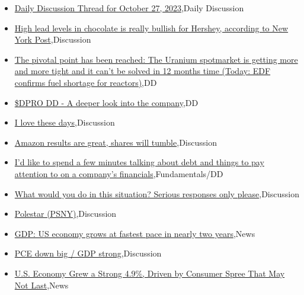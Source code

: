 \documentclass{article}%
\begin{document}
%
\begin{itemize}%
\item%
\href{https://reddit.com/r/wallstreetbets/comments/17hk3jn/daily\_discussion\_thread\_for\_october\_27\_2023/}{Daily Discussion Thread for October 27, 2023},Daily Discussion%
\item%
\href{https://reddit.com/r/wallstreetbets/comments/17hgve8/high\_lead\_levels\_in\_chocolate\_is\_really\_bullish/}{High lead levels in chocolate is really bullish for Hershey, according to New York Post},Discussion%
\item%
\href{https://reddit.com/r/Baystreetbets/comments/17hl3ly/the\_pivotal\_point\_has\_been\_reached\_the\_uranium/}{The pivotal point has been reached: The Uranium spotmarket is getting more and more tight and it can't be solved in 12 months time (Today: EDF confirms fuel shortage for reactors)},DD%
\item%
\href{https://reddit.com/r/Baystreetbets/comments/17h0w02/dpro\_dd\_a\_deeper\_look\_into\_the\_company/}{\$DPRO DD - A deeper look into the company},DD%
\item%
\href{https://reddit.com/r/StockMarket/comments/17hiv6h/i\_love\_these\_days/}{I love these days},Discussion%
\item%
\href{https://reddit.com/r/StockMarket/comments/17h5j2r/amazon\_results\_are\_great\_shares\_will\_tumble/}{Amazon results are great, shares will tumble},Discussion%
\item%
\href{https://reddit.com/r/StockMarket/comments/17h3in6/id\_like\_to\_spend\_a\_few\_minutes\_talking\_about\_debt/}{I'd like to spend a few minutes talking about debt and things to pay attention to on a company's financials},Fundamentals/DD%
\item%
\href{https://reddit.com/r/StockMarket/comments/17h0ebu/what\_would\_you\_do\_in\_this\_situation\_serious/}{What would you do in this situation? Serious responses only please},Discussion%
\item%
\href{https://reddit.com/r/StockMarket/comments/17gvtt1/polestar\_psny/}{Polestar (PSNY)},Discussion%
\item%
\href{https://reddit.com/r/StockMarket/comments/17gvp9w/gdp\_us\_economy\_grows\_at\_fastest\_pace\_in\_nearly/}{GDP: US economy grows at fastest pace in nearly two years},News%
\item%
\href{https://reddit.com/r/StockMarket/comments/17gvn6t/pce\_down\_big\_gdp\_strong/}{PCE down big / GDP strong},Discussion%
\item%
\href{https://reddit.com/r/Economics/comments/17hl1ly/us\_economy\_grew\_a\_strong\_49\_driven\_by\_consumer/}{U.S. Economy Grew a Strong 4.9\%, Driven by Consumer Spree That May Not Last},News%

\end{itemize}
\end{document}
